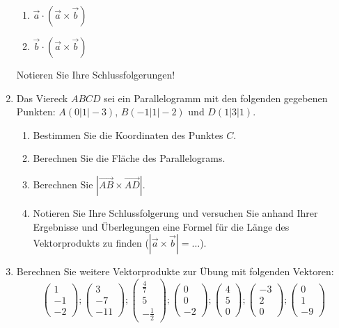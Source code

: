 \documentclass[12pt,a4paper,twoside,fleqn]{article}
\begin{document}
\begin{enumerate}
\begin{multicols}{3}
\begin{enumerate}
    \item $\vec{a}\cdot \left(\vec{a}\times\vec{b}\right)$
    \item $\vec{b}\cdot \left(\vec{a}\times\vec{b}\right)$
    \end{enumerate}
     \end{multicols}
 Notieren Sie Ihre Schlussfolgerungen!
\item Das Viereck $ABCD$ sei ein Parallelogramm mit den folgenden
  gegebenen Punkten: $A(0|1|-3)$, $B(-1|1|-2)$ und $D(1|3|1)$.
  \begin{enumerate}
  \item Bestimmen Sie die Koordinaten des Punktes $C$.%
  \item Berechnen Sie die Fläche des Parallelograms.
  \item Berechnen Sie $|\vec{AB}\times\vec{AD}|$.
  \item Notieren Sie Ihre Schlussfolgerung und versuchen Sie anhand
    Ihrer Ergebnisse und Überlegungen eine
    Formel für die Länge des Vektorprodukts zu finden
    ($|\vec{a}\times\vec{b}|=\ldots$).
  \end{enumerate}
\item Berechnen Sie weitere Vektorprodukte zur Übung mit folgenden
  Vektoren:
  $$\begin{pmatrix}
  1\\-1\\-2
\end{pmatrix};
\begin{pmatrix}
  3\\-7\\-11
\end{pmatrix};
\begin{pmatrix}
  \frac 4 7\\5\\-\frac 1 2
\end{pmatrix};
\begin{pmatrix}
  0\\0\\-2
\end{pmatrix};
\begin{pmatrix}
  4\\5\\0
\end{pmatrix};
\begin{pmatrix}
  -3\\2\\0
\end{pmatrix};
\begin{pmatrix}
  0\\1\\-9
\end{pmatrix}$$
\end{enumerate}
\end{document}
